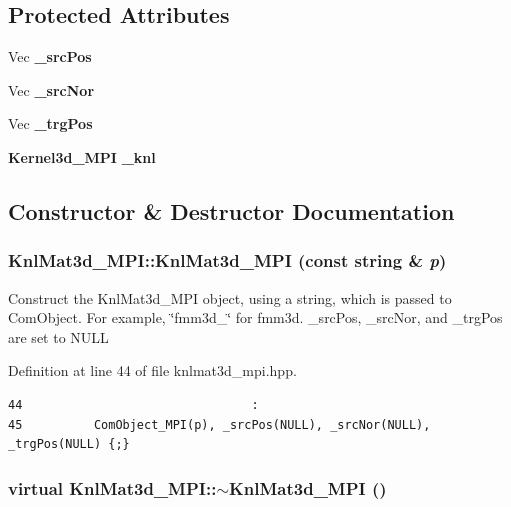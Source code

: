 \subsection*{Protected Attributes}
\begin{CompactItemize}
\item 
Vec {\bf \_\-src\-Pos}
\item 
Vec {\bf \_\-src\-Nor}
\item 
Vec {\bf \_\-trg\-Pos}
\item 
{\bf Kernel3d\_\-MPI} {\bf \_\-knl}
\end{CompactItemize}


\subsection{Constructor \& Destructor Documentation}
\subsubsection{\setlength{\rightskip}{0pt plus 5cm}Knl\-Mat3d\_\-MPI::Knl\-Mat3d\_\-MPI (const string \& {\em p})\hspace{0.3cm}{\tt  [inline]}}\label{classKnlMat3d__MPI_c66fe250a6e3b06ad193f069d8153419_c66fe250a6e3b06ad193f069d8153419}


Construct the Knl\-Mat3d\_\-MPI object, using a string, which is passed to Com\-Object. For example, \char`\"{}fmm3d\_\-\char`\"{} for fmm3d. \_\-src\-Pos, \_\-src\-Nor, and \_\-trg\-Pos are set to NULL 

Definition at line 44 of file knlmat3d\_\-mpi.hpp.

\footnotesize\begin{verbatim}44                                : 
45          ComObject_MPI(p), _srcPos(NULL), _srcNor(NULL), _trgPos(NULL) {;}
\end{verbatim}\normalsize 


\subsubsection{\setlength{\rightskip}{0pt plus 5cm}virtual Knl\-Mat3d\_\-MPI::$\sim$Knl\-Mat3d\_\-MPI ()\hspace{0.3cm}{\tt  [inline, virtual]}}\label{classKnlMat3d__MPI_79335cbcac8d5b9babe0b4a6394e2caa_79335cbcac8d5b9babe0b4a6394e2caa}


